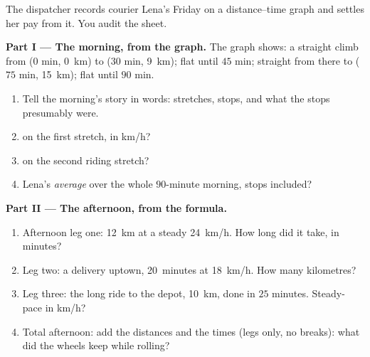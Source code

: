 \begin{problem}\label{pb:g7:motion-average-speed:1}
The dispatcher records courier Lena's Friday on a
distance--time graph and settles her pay from it. You audit the
sheet.

\medskip\noindent\textbf{Part I --- The morning, from the
graph.}
The graph shows: a straight climb from ($0$ min, \qty{0}{km})
to ($30$ min, \qty{9}{km}); flat until $45$ min; straight from
there to ($75$ min, \qty{15}{km}); flat until $90$ min.
\begin{enumerate}
  \item Tell the morning's story in words: stretches, stops,
        and what the stops presumably were.
  \item {} on the first stretch, in \unit{km/h}?
  \item {} on the second riding stretch?
  \item Lena's \emph{average}  over the whole $90$-minute
        morning, stops included?
\end{enumerate}

\medskip\noindent\textbf{Part II --- The afternoon, from the
formula.}
\begin{enumerate}[resume]
  \item Afternoon leg one: \qty{12}{km} at a steady
        \qty{24}{km/h}. How long did it take, in minutes?
  \item Leg two: a delivery uptown, \qty{20}{minutes} at
        \qty{18}{km/h}. How many kilometres?
  \item Leg three: the long ride to the depot, \qty{10}{km},
        done in $25$ minutes. Steady-pace  in
        \unit{km/h}?
  \item Total afternoon: add the distances and the times (legs
        only, no breaks): what  did the wheels
        keep while rolling?
\end{enumerate}


\end{problem}
